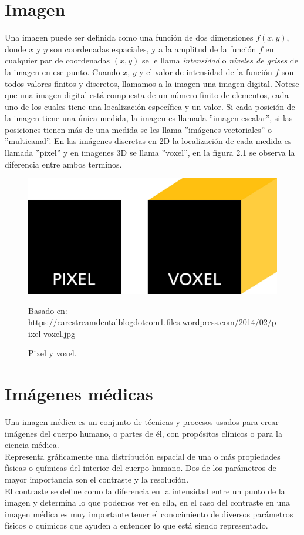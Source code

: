 \documentclass[12pt]{report}
\begin{document}
\section{Imagen}
Una imagen puede ser definida como una función de dos dimensiones $f(x, y)$, donde $x$ y $y$ son coordenadas espaciales, y a la amplitud de la función $f$ en cualquier par de coordenadas $(x, y)$ se le llama \textit{intensidad} o \textit{niveles de grises} de la imagen en ese punto. Cuando $x$, $y$ y el valor de intensidad de la función $f$ son todos valores finitos y discretos, llamamos a la imagen una imagen digital. Notese que una imagen digital está compuesta de un número finito de elementos, cada uno de los cuales tiene una localización específica y un valor. Si cada posición de la imagen tiene una única medida, la imagen es llamada ''imagen escalar'', si las posiciones tienen más de una medida se les llama ''imágenes vectoriales'' o ''multicanal''. En las imágenes discretas en 2D la localización de cada medida es llamada ''pixel'' y en imagenes 3D se llama ''voxel'', en la figura 2.1 se observa la diferencia entre ambos terminos. \cite{metodos} \cite{imag}

\begin{figure}[H]
\centering
\includegraphics[width = 5 cm, height = 3 cm]{pixel}
\caption{Pixel y voxel.}
Basado en: https://carestreamdentalblogdotcom1.files.wordpress.com/2014/02/pixel-voxel.jpg
\end{figure}

\section{Imágenes médicas}
Una imagen médica es un conjunto de técnicas y procesos usados para crear imágenes del cuerpo humano, o partes de él, con propósitos clínicos  o para la ciencia médica.\\

Representa gráficamente una distribución espacial de una o más propiedades físicas o químicas del interior del cuerpo humano. Dos de los parámetros de mayor importancia son el contraste y la resolución. \\

El contraste se define como la diferencia en la intensidad entre un punto de  la imagen y determina lo que podemos ver en ella, en el caso del contraste en una imagen médica es muy importante tener el conocimiento de diversos parámetros físicos o químicos que ayuden a entender lo que está siendo representado.\\
\end{document}

